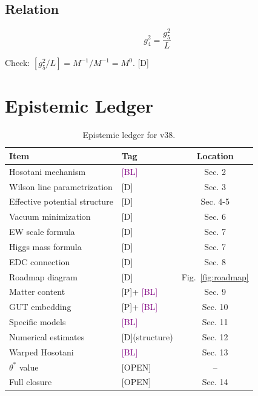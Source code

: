 \documentclass[11pt,a4paper]{article}
\newcommand{\tagD}{\textcolor{blue!70!black}{[D]}}
\newcommand{\tagP}{\textcolor{green!50!black}{[P]}}
\newcommand{\tagBL}{\textcolor{purple}{[BL]}}
\newcommand{\tagOPEN}{\textcolor{red!70!black}{[OPEN]}}
\begin{document}
\subsection{Relation}

\begin{equation}
\label{eq:app-g-relation}
g_4^2 = \frac{g_5^2}{L}
\end{equation}

Check: $[g_5^2/L] = M^{-1} / M^{-1} = M^0$. \checkmark \tagD

\section{Epistemic Ledger}
\label{app:ledger}

\begin{table}[h]
\centering
\begin{tabular}{llc}
\toprule
Item & Tag & Location \\
\midrule
Hosotani mechanism & \tagBL & Sec. 2 \\
Wilson line parametrization & \tagD & Sec. 3 \\
Effective potential structure & \tagD & Sec. 4-5 \\
Vacuum minimization & \tagD & Sec. 6 \\
EW scale formula & \tagD & Sec. 7 \\
Higgs mass formula & \tagD & Sec. 7 \\
EDC connection & \tagD & Sec. 8 \\
Roadmap diagram & \tagD & Fig.~\ref{fig:roadmap} \\
Matter content & \tagP + \tagBL & Sec. 9 \\
GUT embedding & \tagP + \tagBL & Sec. 10 \\
Specific models & \tagBL & Sec. 11 \\
Numerical estimates & \tagD (structure) & Sec. 12 \\
Warped Hosotani & \tagBL & Sec. 13 \\
$\theta^*$ value & \tagOPEN & -- \\
Full closure & \tagOPEN & Sec. 14 \\
\bottomrule
\end{tabular}
\caption{Epistemic ledger for v38.}
\label{tab:ledger}
\end{table}

\end{document}
